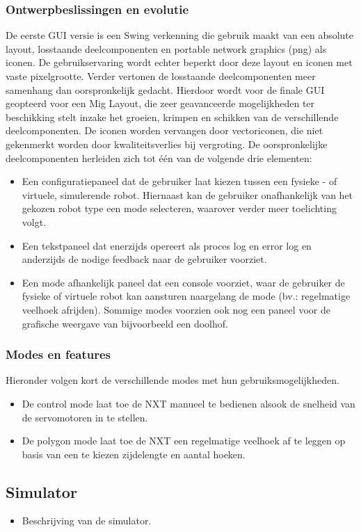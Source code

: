\documentclass[tt1]{penoverslag}
\begin{document}
\subsubsection{Ontwerpbeslissingen en evolutie}
De eerste GUI versie is een Swing verkenning die gebruik maakt van een absolute layout, losstaande deelcomponenten en portable network  graphics (png) als iconen. De gebruikservaring wordt echter beperkt door deze layout en iconen met vaste pixelgrootte. Verder vertonen de losstaande deelcomponenten meer samenhang dan oorspronkelijk gedacht. Hierdoor wordt voor de finale GUI geopteerd voor een Mig Layout, die zeer geavanceerde mogelijkheden ter beschikking stelt inzake het groeien, krimpen en schikken van de verschillende deelcomponenten. De iconen worden vervangen door vectoriconen, die niet gekenmerkt worden door kwaliteitsverlies bij vergroting. De oorspronkelijke deelcomponenten herleiden zich tot één van de volgende drie elementen:
\begin{itemize}
\item Een configuratiepaneel dat de gebruiker laat kiezen tussen een fysieke - of virtuele, simulerende robot. Hiernaast kan de gebruiker onafhankelijk van het gekozen robot type een mode selecteren, waarover verder meer toelichting volgt. 
\item Een tekstpaneel dat enerzijds opereert als proces log en error log en anderzijds de nodige feedback naar de gebruiker voorziet.  
\item Een mode afhankelijk paneel dat een console voorziet, waar de gebruiker de fysieke of virtuele robot kan aansturen naargelang de mode (bv.: regelmatige veelhoek afrijden). Sommige modes voorzien ook nog een paneel voor de grafische weergave van bijvoorbeeld een doolhof.
\end{itemize}
\subsubsection{Modes en features}
Hieronder volgen kort de verschillende modes met hun gebruiksmogelijkheden.
\begin{itemize}
\item De control mode laat toe de NXT manueel te bedienen alsook de snelheid van de servomotoren in te stellen.
\item De polygon mode laat toe de NXT een regelmatige veelhoek af te leggen op basis van een te kiezen zijdelengte en aantal hoeken.
\end{itemize}

\subsection{Simulator}
\begin{itemize}
\item Beschrijving van de simulator.
\end{itemize}
\end{document}
